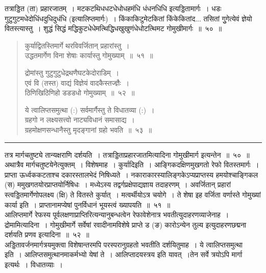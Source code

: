\documentclass[11pt, openany]{book}
\begin{document}
\newpage

{\qt तत्राड्डित (ता) प्रहारजातम्~। मटकटथिधधटधेधोधहमंधि धंधनधिधि इत्यड्डितामार्गः~। धडः गुटुगुटमधेदोधिंधदुधिदुधंधि (इत्यालिप्तमार्गः)~। किंकाकिटुमेटकितां किंकेकितांद... तसितां गुुगेत्येवं ज्ञेयो वितस्त्यास्तु~। शुद्धं सिद्धं मद्धिकुटधेधेमत्थिद्धिधखुखुणंधेधोटत्थिमट गोमुखीमार्गः~॥~५०~॥}

\begin{quote}
{\na  कुर्याद्वितस्तिमार्गे थरविवर्जितान् प्रहारांस्तु~।\\
 उद्धतमार्गेण विना शेषाः कार्यास्तु गोमुख्याम्~॥~५१~॥

 द्रोमांस्तु गुटुगुटुधेद्रथणैघटकेदोराडिम्~।\\
 एवं वि (तस्त) वाद्यं विज्ञेयं वादकैस्तज्ज्ञैः~।\\
 ठिणिखिठिणिहो डडडधो गोमुख्याम्~॥~५२~॥

 ये त्वालिप्तसमुत्था (:) सर्वमार्गैस्तु ते विधातव्या (:)~।\\
 ग्रहगो न लक्ष्यसत्त्वो नाट्यविधानं समासाद्य~।\\
 ग्रहमोक्षणसन्धानैस्तु मृदङ्गानां ग्रहो भवति~॥~५३~॥}
\end{quote}

\hrule

\vspace{2mm}
\noindent
तत्र मार्गचतुष्ट्ये तान्यक्षराणि दर्शयति~। {\qtt तत्राड्डिताप्रहारजातमित्यादिना} गोमुखीमार्ग इत्यन्तेन~॥~५०~॥\\

अथात्रैव मार्गचतुष्टयेनेत्युक्तम्~। {\qtt विशेषमाह~। कुर्यादिइति}~। आङ्गिकदक्षिणमुखगतो रेफो वितस्तमार्गः~। प्राप्ता ऊर्ध्वककटताश्च दकारस्तालभेदं निषिध्यते~। नकाराकारस्यालिङ्गकेऽप्यप्राप्तस्य हमयोश्चाङ्गिकल (स) ममुखगतयोरप्राप्तयोर्निषिधः~। मध्येऽस्य तद्वर्गप्रक्षेपाद्यज्ञाय तदाहरणम्~। अवर्जितान् प्रहारां स्त्वड्डितमार्गेणोपलक्ष्य (क्षि) ते वितस्ते कुर्यात्~। मत्वर्थीयोऽत्र चयोगे~। ते शेषा इह वर्जिता वर्णास्ते गोमुख्यां कार्या इति~। प्राप्तानामप्येषां पुनर्विधानं भूयस्त्वं ख्यापयति~॥~५१~॥\\

आलिप्तमार्गे रेफस्य पूर्वलक्षणाप्राप्तिरित्यन्यानुबन्धत्वेन रेफावेशेनात्र भवतीत्युदाहरणव्याजेनाह~।  {\qtt द्रोमामित्यादिना}~। गोमुखीमार्गे सर्वेषां रवादीनामविशेषे प्राप्ते ड (ङ) कारोऽन्येन तुल्य इत्युदाहरणछद्मना दर्शयति प्रणव इत्यादिना~॥~५२~॥\\

अड्डितावर्जनमार्गत्रयमुक्त्वा विशेषान्तरमपि परस्परानुग्रहतो भवतीति दर्शयितुमाह~। ये त्वालिप्तसमुत्था इति~। आलिप्तसमुत्थानमाकर्मभ्यो येषां ते~। आलिप्तादयस्त्रय इति यावत्~।तेन सर्वे त्रयोऽपि मार्गा इत्यर्थः~। {\qtt विधातव्याः}~। 
\end{document}
